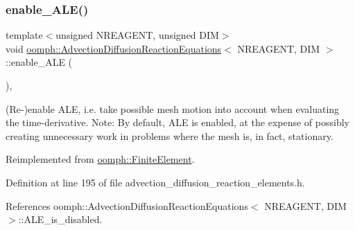 \subsubsection{\texorpdfstring{enable\+\_\+\+A\+L\+E()}{enable\_ALE()}}
{\footnotesize\ttfamily template$<$unsigned N\+R\+E\+A\+G\+E\+NT, unsigned D\+IM$>$ \\
void \hyperlink{classoomph_1_1AdvectionDiffusionReactionEquations}{oomph\+::\+Advection\+Diffusion\+Reaction\+Equations}$<$ N\+R\+E\+A\+G\+E\+NT, D\+IM $>$\+::enable\+\_\+\+A\+LE (\begin{DoxyParamCaption}{ }\end{DoxyParamCaption})\hspace{0.3cm}{\ttfamily [inline]}, {\ttfamily [virtual]}}



(Re-\/)enable A\+LE, i.\+e. take possible mesh motion into account when evaluating the time-\/derivative. Note\+: By default, A\+LE is enabled, at the expense of possibly creating unnecessary work in problems where the mesh is, in fact, stationary. 



Reimplemented from \hyperlink{classoomph_1_1FiniteElement_a92ef8967fa4e2d6c33c51ea3efa3aa82}{oomph\+::\+Finite\+Element}.



Definition at line 195 of file advection\+\_\+diffusion\+\_\+reaction\+\_\+elements.\+h.



References oomph\+::\+Advection\+Diffusion\+Reaction\+Equations$<$ N\+R\+E\+A\+G\+E\+N\+T, D\+I\+M $>$\+::\+A\+L\+E\+\_\+is\+\_\+disabled.

\mbox{\label{classoomph_1_1AdvectionDiffusionReactionEquations_a32feca5a89aee13169544e2eb0af975a}} 
